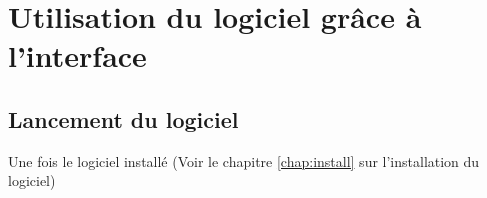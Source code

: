 \chapter{Utilisation du logiciel grâce à l'interface}
\section{Lancement du logiciel}
Une fois le logiciel installé (Voir le chapitre \ref{chap:install} sur l'installation du logiciel)



